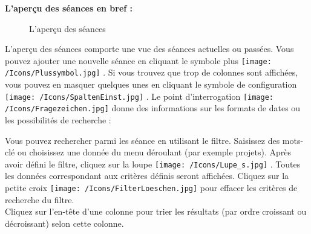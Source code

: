 \vspace{5cm}

\pagebreak
\textbf{L'aperçu des séances en bref :}

\begin{figure}[H]
\caption{L'aperçu des séances}
\end{figure}

L'aperçu des séances comporte une vue des séances actuelles ou passées. Vous pouvez ajouter une nouvelle séance en cliquant le symbole plus \texttt{[image: /Icons/Plussymbol.jpg]} . Si vous trouvez que trop de colonnes sont affichées, vous pouvez en masquer quelques unes en cliquant le symbole de configuration \texttt{[image: /Icons/SpaltenEinst.jpg]} . Le point d'interrogation \texttt{[image: /Icons/Fragezeichen.jpg]}  donne des informations sur les formats de dates ou les possibilités de recherche : 

\begin{figure}[H]
\end{figure}

Vous pouvez rechercher parmi les séance en utilisant le filtre. Saisissez des mots-clé ou choisissez une donnée du menu déroulant (par exemple projets). Après avoir défini le filtre, cliquez sur la loupe \texttt{[image: /Icons/Lupe\_s.jpg]} . Toutes les données correspondant aux critères définis seront affichées. Cliquez sur la petite croix \texttt{[image: /Icons/FilterLoeschen.jpg]}  pour effacer les critères de recherche du filtre. \\
Cliquez sur l'en-tête d'une colonne pour trier les résultats (par ordre croissant ou décroissant) selon cette colonne.

